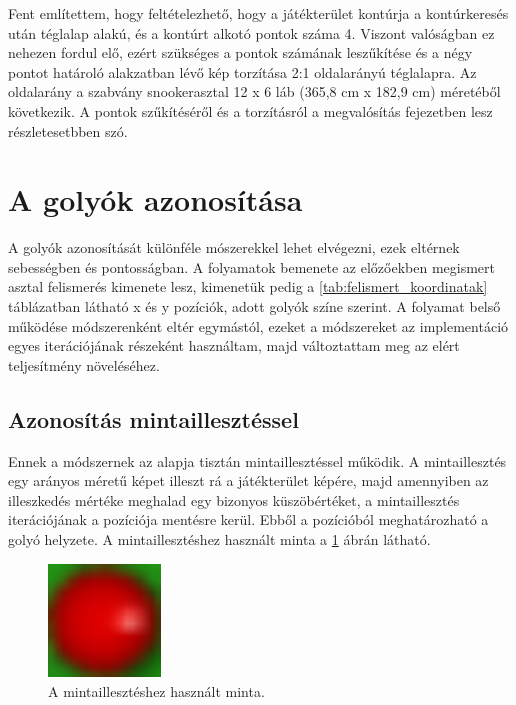 \par Fent említettem, hogy feltételezhető, hogy a játékterület kontúrja a kontúrkeresés után téglalap alakú, és a kontúrt alkotó pontok száma 4. Viszont valóságban ez nehezen fordul elő, ezért szükséges a pontok számának leszűkítése és a négy pontot határoló alakzatban lévő kép torzítása 2:1 oldalarányú téglalapra. Az oldalarány a szabvány snookerasztal 12 x 6 láb (365,8 cm x 182,9 cm)\cite{snooker_rules} méretéből következik. A pontok szűkítéséről és a torzításról a megvalósítás fejezetben lesz részletesetbben szó.

\section{A golyók azonosítása}
A golyók azonosítását különféle mószerekkel lehet elvégezni, ezek eltérnek sebességben és pontosságban. A folyamatok bemenete az előzőekben megismert asztal felismerés kimenete lesz, kimenetük pedig a \ref{tab:felismert_koordinatak} táblázatban látható x és y pozíciók, adott golyók színe szerint. A folyamat belső működése módszerenként eltér egymástól, ezeket a módszereket az implementáció egyes iterációjának részeként használtam, majd változtattam meg az elért teljesítmény növeléséhez.

\subsection{Azonosítás mintaillesztéssel}
Ennek a módszernek az alapja tisztán mintaillesztéssel működik. A mintaillesztés egy arányos méretű képet illeszt rá a játékterület képére, majd amennyiben az illeszkedés mértéke meghalad egy bizonyos küszöbértéket, a mintaillesztés iterációjának a pozíciója mentésre kerül. Ebből a pozícióból meghatározható a golyó helyzete. A mintaillesztéshez használt minta a \ref{fig:minta_kep} ábrán látható.

\begin{figure}[!ht]
    \centering
    \includegraphics[width=30mm, keepaspectratio]{figures/template_red.png}
    \caption{A mintaillesztéshez használt minta.}
    \label{fig:minta_kep}
\end{figure}

